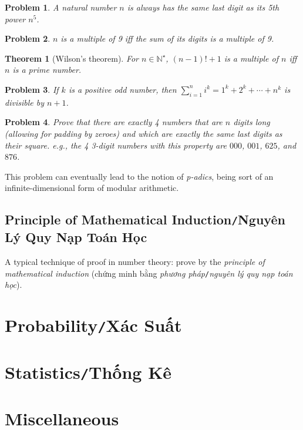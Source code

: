 \documentclass{article}
\numberwithin{equation}{section}
\newtheorem{theorem}{Theorem}[section]
\newtheorem{problem}{Problem}[section]
\begin{document}
\begin{problem}
	A natural number $n$ is always has the same last digit as its 5th power $n^5$.
\end{problem}

\begin{problem}
	$n$ is a multiple of 9 iff the sum of its digits is a multiple of 9.
\end{problem}

\begin{theorem}[Wilson's theorem]
	For $n\in\mathbb{N}^\star$, $(n - 1)! + 1$ is a multiple of $n$ iff $n$ is a prime number.
\end{theorem}

\begin{problem}
	If $k$ is a positive odd number, then $\sum_{i=1}^n i^k = 1^k + 2^k + \cdots + n^k$ is divisible by $n + 1$.
\end{problem}

\begin{problem}
	Prove that there are exactly 4 numbers that are $n$ digits long (allowing for padding by zeroes) and which are exactly the same last digits as their square. e.g., the 4 3-digit numbers with this property are $000$, $001$, $625$, and $876$.
\end{problem}
This problem can eventually lead to the notion of \textit{p-adics}, being sort of an infinite-dimensional form of modular arithmetic.

\subsection{Principle of Mathematical Induction\texttt{/}Nguyên Lý Quy Nạp Toán Học}
A typical technique of proof in number theory: prove by the \textit{principle of mathematical induction} (chứng minh bằng \textit{phương pháp}\texttt{/}\textit{nguyên lý quy nạp toán học}).

\section{Probability\texttt{/}Xác Suất}

\section{Statistics\texttt{/}Thống Kê}

\section{Miscellaneous}
\end{document}

